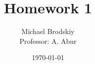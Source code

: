 


\title{Homework 1}
\date{\today}
\author{Michael Brodskiy\\ \small Professor: A. Abur}



\maketitle

